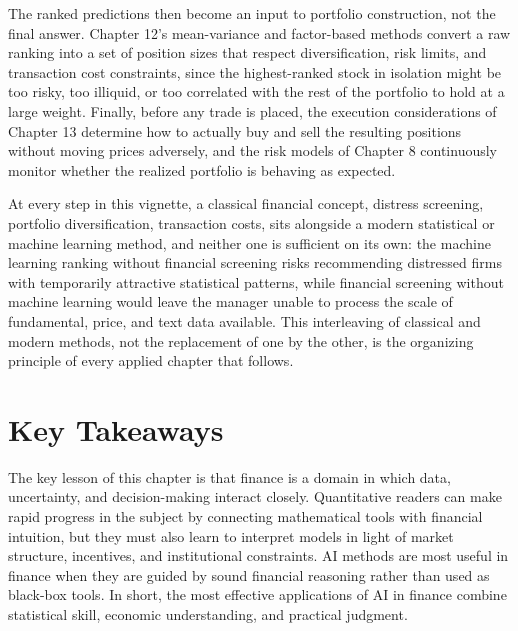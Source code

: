 \documentclass[../ai_in_finance]{subfiles}
\begin{document}
The ranked predictions then become an input to portfolio construction, not the final answer. Chapter 12's mean-variance and factor-based methods convert a raw ranking into a set of position sizes that respect diversification, risk limits, and transaction cost constraints, since the highest-ranked stock in isolation might be too risky, too illiquid, or too correlated with the rest of the portfolio to hold at a large weight. Finally, before any trade is placed, the execution considerations of Chapter 13 determine how to actually buy and sell the resulting positions without moving prices adversely, and the risk models of Chapter 8 continuously monitor whether the realized portfolio is behaving as expected.

At every step in this vignette, a classical financial concept, distress screening, portfolio diversification, transaction costs, sits alongside a modern statistical or machine learning method, and neither one is sufficient on its own: the machine learning ranking without financial screening risks recommending distressed firms with temporarily attractive statistical patterns, while financial screening without machine learning would leave the manager unable to process the scale of fundamental, price, and text data available. This interleaving of classical and modern methods, not the replacement of one by the other, is the organizing principle of every applied chapter that follows.

\section{Key Takeaways}

The key lesson of this chapter is that finance is a domain in which data, uncertainty, and decision-making interact closely. Quantitative readers can make rapid progress in the subject by connecting mathematical tools with financial intuition, but they must also learn to interpret models in light of market structure, incentives, and institutional constraints. AI methods are most useful in finance when they are guided by sound financial reasoning rather than used as black-box tools. In short, the most effective applications of AI in finance combine statistical skill, economic understanding, and practical judgment.
\end{document}
